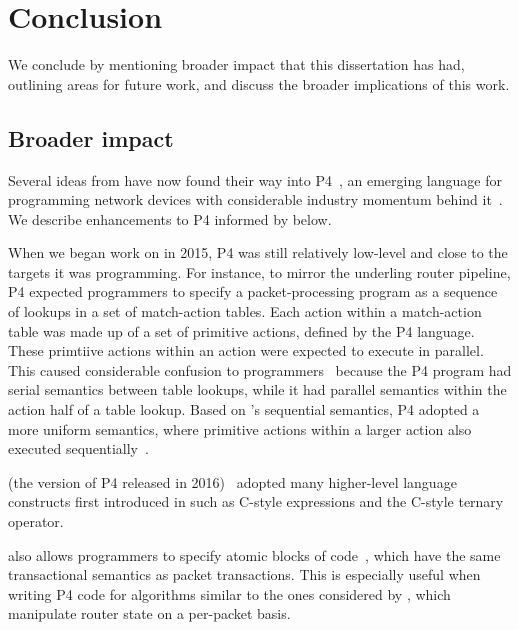 \chapter{Conclusion}
\label{chap:concl}

We conclude by mentioning broader impact that this dissertation has had,
outlining areas for future work, and discuss the broader implications of this work.

\section{Broader impact}
\label{s:impact}
Several ideas from \pktlanguage have now found their way into P4~\cite{p4}, an
emerging language for programming network devices with considerable industry
momentum behind it~\cite{p4org}. We describe enhancements to P4 informed by
\pktlanguage below.
\begin{CompactEnumerate}
\item When we began work on \pktlanguage in 2015, P4 was still relatively
low-level and close to the targets it was programming. For instance, to mirror
the underling router pipeline, P4 expected programmers to specify a
packet-processing program as a sequence of lookups in a set of match-action
tables. Each action within a match-action table was made up of a set of
primitive actions, defined by the P4 language. These primtiive actions within
an action were expected to execute in parallel. This caused considerable
confusion to programmers~\cite{p4-semantics} because the P4 program had serial semantics between
table lookups, while it had parallel semantics within the action half of a
table lookup. Based on \pktlanguage's sequential semantics, P4 adopted a more
uniform semantics, where primitive actions within a larger action also executed
sequentially~\cite{p4_sequential_pr, p4_sequential_issue}.
\item \pfs (the version of P4 released in 2016)~\cite{p4_16} adopted many
higher-level language constructs first introduced in \pktlanguage such as C-style
expressions and the C-style ternary operator.
\item \pfs also allows programmers to specify atomic blocks of code~\cite{p4_atomic_pr, p4_atomic_issue}, which
have the same transactional semantics as packet transactions. This is
especially useful when writing P4 code for algorithms similar to the ones
considered by \pktlanguage, which manipulate router state on a per-packet
basis.
\end{CompactEnumerate}


